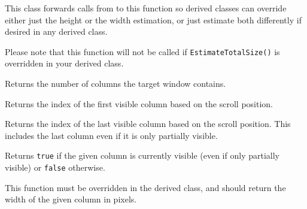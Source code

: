 
This class forwards calls from
to this function so derived classes can override either just the height or
the width estimation, or just estimate both differently if desired in any
 derived class.

Please note that this function will not be called if {\tt EstimateTotalSize()}
is overridden in your derived class.


\label{wxvarhscrollhelpergetcolumncount}


Returns the number of columns the target window contains.




\label{wxvarhscrollhelpergetvisiblecolumnsbegin}


Returns the index of the first visible column based on the scroll position.


\label{wxvarhscrollhelpergetvisiblecolumnsend}


Returns the index of the last visible column based on the scroll position. This
includes the last column even if it is only partially visible.


\label{wxvarhscrollhelperiscolumnvisible}


Returns {\tt true} if the given column is currently visible (even if only
partially visible) or {\tt false} otherwise.


\label{wxvarhscrollhelperongetcolumnwidth}


This function must be overridden in the derived class, and should return the
width of the given column in pixels.


